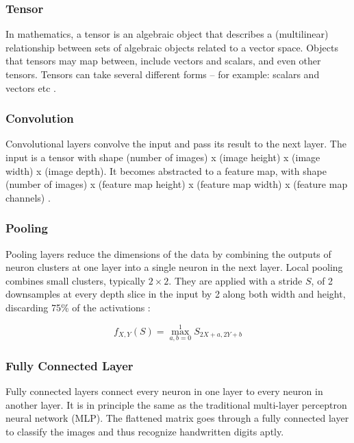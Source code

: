 \documentclass[12pt, a4paper]{report}
\begin{document}
\subsubsection{Tensor}
\label{subsub:tensor}

In mathematics, a tensor is an algebraic object that describes a (multilinear) relationship between sets of algebraic objects related to a vector space. Objects that tensors may map between, include vectors and scalars, and even other tensors. Tensors can take several different forms – for example: scalars and vectors etc \cite{wiki:tensor}.

\subsubsection{Convolution}
\label{subsub:convolution}

Convolutional layers convolve the input and pass its result to the next layer. The input is a tensor with shape (number of images) x (image height) x (image width) x (image depth). It becomes abstracted to a feature map, with shape (number of images) x (feature map height) x (feature map width) x (feature map channels) \cite{wiki:cnns}.

\subsubsection{Pooling}
\label{subsub:pooling}

Pooling layers reduce the dimensions of the data by combining the outputs of neuron clusters at one layer into a single neuron in the next layer. Local pooling combines small clusters, typically $2\times 2$. They are applied with a stride $S$, of 2 downsamples at every depth slice in the input by 2 along both width and height, discarding 75\% of the activations \cite{wiki:cnns}:

\begin{equation}
    \label{equ:5.8}
    f_{X,Y}(S) = \max_{a,b = 0}^1 S_{2X + a, 2Y + b}
\end{equation}

\subsubsection{Fully Connected Layer}
\label{subsub:fullycnlr}

Fully connected layers connect every neuron in one layer to every neuron in another layer. It is in principle the same as the traditional multi-layer perceptron neural network (MLP). The flattened matrix goes through a fully connected layer to classify the images \cite{wiki:cnns} and thus recognize handwritten digits aptly.
\end{document}
